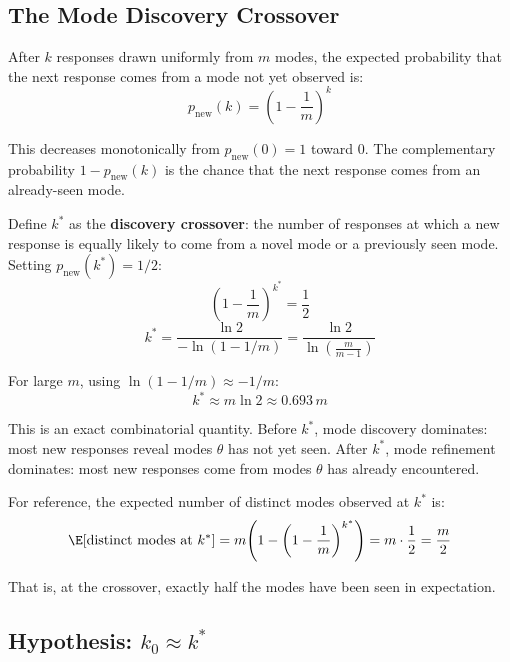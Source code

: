 \subsection{The Mode Discovery Crossover}

After $k$ responses drawn uniformly from $m$ modes, the expected probability that the next response comes from a mode not yet observed is:
\begin{equation}
    p_{\mathrm{new}}(k) = \left(1 - \frac{1}{m}\right)^{k}
\end{equation}

This decreases monotonically from $p_{\mathrm{new}}(0) = 1$ toward 0.
The complementary probability $1 - p_{\mathrm{new}}(k)$ is the chance that the next response comes from an already-seen mode.

Define $k^*$ as the \textbf{discovery crossover}: the number of responses at which a new response is equally likely to come from a novel mode or a previously seen mode.
Setting $p_{\mathrm{new}}(k^*) = 1/2$:
\begin{equation}
    \left(1 - \frac{1}{m}\right)^{k^*} = \frac{1}{2}
\end{equation}
\begin{equation}\label{eq:kstar}
    k^* = \frac{\ln 2}{-\ln(1 - 1/m)} = \frac{\ln 2}{\ln\!\left(\frac{m}{m-1}\right)}
\end{equation}

For large $m$, using $\ln(1 - 1/m) \approx -1/m$:
\begin{equation}\label{eq:kstar-approx}
    k^* \approx m \ln 2 \approx 0.693\, m
\end{equation}

This is an exact combinatorial quantity.
Before $k^*$, mode discovery dominates: most new responses reveal modes $\theta$ has not yet seen.
After $k^*$, mode refinement dominates: most new responses come from modes $\theta$ has already encountered.

For reference, the expected number of distinct modes observed at $k^*$ is:
\begin{equation}
    \E[\text{distinct modes at } k^*] = m\!\left(1 - \left(1 - \frac{1}{m}\right)^{k^*}\right) = m \cdot \frac{1}{2} = \frac{m}{2}
\end{equation}

That is, at the crossover, exactly half the modes have been seen in expectation.

\subsection{Hypothesis: \texorpdfstring{$k_0 \approx k^*$}{k0 approx k*}}

